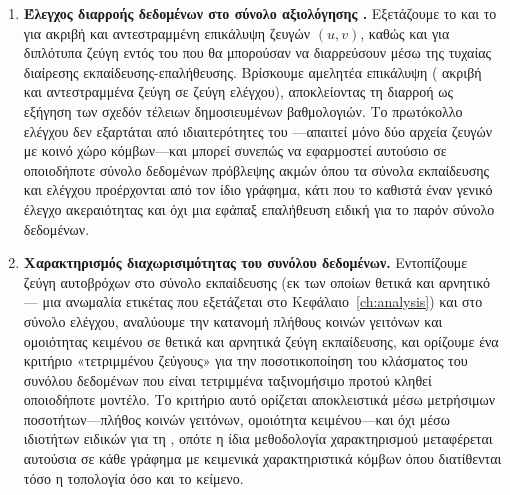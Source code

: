 \begin{enumerate}

    \item \textbf{Έλεγχος διαρροής δεδομένων στο σύνολο αξιολόγησης .}
    Εξετάζουμε το \texttt{} και το \texttt{} για
    ακριβή και αντεστραμμένη επικάλυψη ζευγών $(u,v)$, καθώς και για διπλότυπα
    ζεύγη εντός του \texttt{} που θα μπορούσαν να διαρρεύσουν
    μέσω της τυχαίας διαίρεσης εκπαίδευσης-επαλήθευσης.
    Βρίσκουμε αμελητέα
    επικάλυψη (\LeakageExact{} ακριβή και \LeakageReversed{} αντεστραμμένα ζεύγη σε \TestPairs{} ζεύγη ελέγχου),
    αποκλείοντας τη διαρροή ως εξήγηση των σχεδόν τέλειων δημοσιευμένων
    βαθμολογιών.
    Το πρωτόκολλο ελέγχου δεν εξαρτάται από ιδιαιτερότητες του
    ---απαιτεί μόνο δύο αρχεία ζευγών με κοινό χώρο κόμβων---και
    μπορεί συνεπώς να εφαρμοστεί αυτούσιο σε οποιοδήποτε σύνολο δεδομένων
    πρόβλεψης ακμών όπου τα σύνολα εκπαίδευσης και ελέγχου προέρχονται από τον
    ίδιο γράφημα, κάτι που το καθιστά έναν γενικό έλεγχο ακεραιότητας και όχι μια
    εφάπαξ επαλήθευση ειδική για το παρόν σύνολο δεδομένων.

    \item \textbf{Χαρακτηρισμός διαχωρισιμότητας του συνόλου δεδομένων.} Εντοπίζουμε
    \SelfLoopsTrain{} ζεύγη αυτοβρόχων στο σύνολο εκπαίδευσης (εκ των οποίων \SelfLoopsTrainPos{} θετικά
    και \SelfLoopsTrainNeg{} αρνητικό --- μια ανωμαλία ετικέτας που εξετάζεται στο
    Κεφάλαιο~\ref{ch:analysis}) και \SelfLoopsTest{} στο σύνολο ελέγχου, αναλύουμε την
    κατανομή πλήθους κοινών γειτόνων και ομοιότητας κειμένου σε θετικά και
    αρνητικά ζεύγη εκπαίδευσης, και ορίζουμε ένα κριτήριο «τετριμμένου ζεύγους»
    για την ποσοτικοποίηση του κλάσματος του συνόλου δεδομένων που είναι
    τετριμμένα ταξινομήσιμο προτού κληθεί οποιοδήποτε μοντέλο.
    Το κριτήριο αυτό ορίζεται αποκλειστικά μέσω μετρήσιμων ποσοτήτων---πλήθος
    κοινών γειτόνων, ομοιότητα κειμένου---και όχι μέσω ιδιοτήτων ειδικών για τη
    , οπότε η ίδια μεθοδολογία χαρακτηρισμού μεταφέρεται αυτούσια
    σε κάθε γράφημα με κειμενικά χαρακτηριστικά κόμβων όπου διατίθενται τόσο η
    τοπολογία όσο και το κείμενο.


\end{enumerate}
